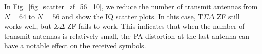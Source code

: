\documentclass[10pt,twocolumn,twoside]{IEEEtran}
\begin{document}
In Fig.~\ref{fig_scatter_zf_56_10}, we reduce the number of transmit antennas from $N=64$ to $N=56$ and show the IQ scatter plots.
In this case, T$\Sigma \Delta$ ZF still works well, but $\Sigma \Delta$ ZF fails to work.
This indicates that when the number of transmit antennas is relatively small, the PA distortion at the last antenna can have a notable effect on the received symbols.















\end{document}
